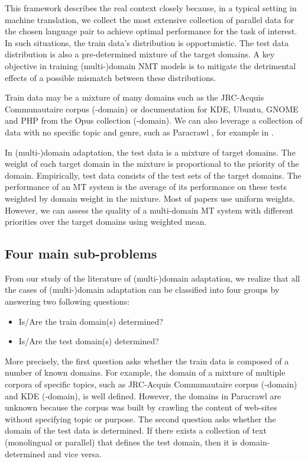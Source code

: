 This framework describes the real context closely because, in a typical setting in machine translation, we collect the most extensive collection of parallel data for the chosen language pair to achieve optimal performance for the task of interest. In such situations, the train data's distribution is opportunistic. The test data distribution is also a pre-determined mixture of the target domains. A key objective in training (multi-)domain NMT models is to mitigate the detrimental effects of a possible mismatch between these distributions. 

Train data may be a mixture of many domains such as the JRC-Acquis Communautaire corpus (-domain) \citep{Steinberger06acquis} or documentation for KDE, Ubuntu, GNOME and PHP from the Opus collection \citep{Tiedemann09news} (-domain). We can also leverage a collection of data with no specific topic and genre, such as Paracrawl \citep{Banon20Paracrawl}, for example in \citet{nathan19facebook}. 

In (multi-)domain adaptation, the test data is a mixture of target domains. The weight of each target domain in the mixture is proportional to the priority of the domain. Empirically, test data consists of the test sets of the target domains. The performance of an MT system is the average of its performance on these tests weighted by domain weight in the mixture. Most of papers use uniform weights. However, we can assess the quality of a multi-domain MT system with different priorities over the target domains using weighted mean.

\subsection{Four main sub-problems}
\label{ssec:4cases-chap3}
From our study of the literature of (multi-)domain adaptation, we realize that all the cases of (multi-)domain adaptation can be classified into four groups by answering two following questions:
\begin{itemize}
	\item Is/Are the train domain(s) determined?
	\item Is/Are the test domain(s) determined?
\end{itemize}
More precisely, the first question asks whether the train data is composed of a number of known domains. For example, the domain of a mixture of multiple corpora of specific topics, such as JRC-Acquis Communautaire corpus (-domain) and KDE (-domain), is well defined. However, the domains in Paracrawl \citep{Banon20Paracrawl} are unknown because the corpus was built by crawling the content of web-sites without specifying topic or purpose. The second question asks whether the domain of the test data is determined. If there exists a collection of text (monolingual or parallel) that defines the test domain, then it is domain-determined and vice versa.

